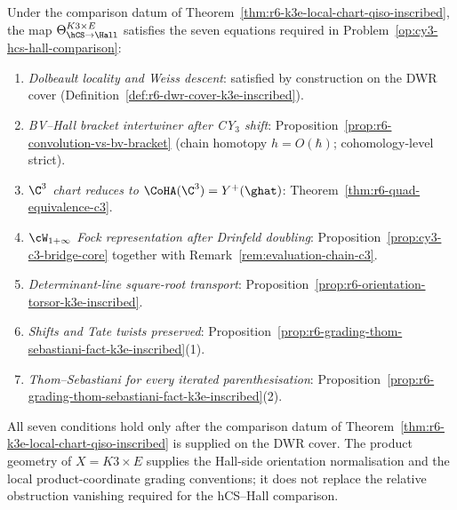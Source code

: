 \begin{remark}
\label{rem:r6-seven-compatibility-equations}
Under the comparison datum of
Theorem~\ref{thm:r6-k3e-local-chart-qiso-inscribed}, the map
$\Theta^{K3\times E}_{\hCS\to\Hall}$ satisfies the seven equations
required in Problem~\ref{op:cy3-hcs-hall-comparison}:
\begin{enumerate}
\item[(1)] \emph{Dolbeault locality and Weiss descent}: satisfied by
construction on the DWR cover
(Definition~\ref{def:r6-dwr-cover-k3e-inscribed}).
\item[(2)] \emph{BV--Hall bracket intertwiner after CY$_3$ shift}:
Proposition~\ref{prop:r6-convolution-vs-bv-bracket}
(chain homotopy $h=O(\hbar)$; cohomology-level strict).
\item[(3)] \emph{$\C^3$ chart reduces to
$\CoHA(\C^3)=Y^+(\ghat)$}:
Theorem~\ref{thm:r6-quad-equivalence-c3}.
\item[(4)] \emph{$\cW_{1+\infty}$ Fock representation after
Drinfeld doubling}:
Proposition~\ref{prop:cy3-c3-bridge-core} together with
Remark~\ref{rem:evaluation-chain-c3}.
\item[(5)] \emph{Determinant-line square-root transport}:
Proposition~\ref{prop:r6-orientation-torsor-k3e-inscribed}.
\item[(6)] \emph{Shifts and Tate twists preserved}:
Proposition~\ref{prop:r6-grading-thom-sebastiani-fact-k3e-inscribed}(1).
\item[(7)] \emph{Thom--Sebastiani for every iterated parenthesisation}:
Proposition~\ref{prop:r6-grading-thom-sebastiani-fact-k3e-inscribed}(2).
\end{enumerate}
All seven conditions hold only after the comparison datum of
Theorem~\ref{thm:r6-k3e-local-chart-qiso-inscribed} is supplied on the
DWR cover. The product geometry of $X=K3\times E$ supplies the
Hall-side orientation normalisation and the local product-coordinate
grading conventions; it does not replace the relative obstruction
vanishing required for the hCS--Hall comparison.
\end{remark}

